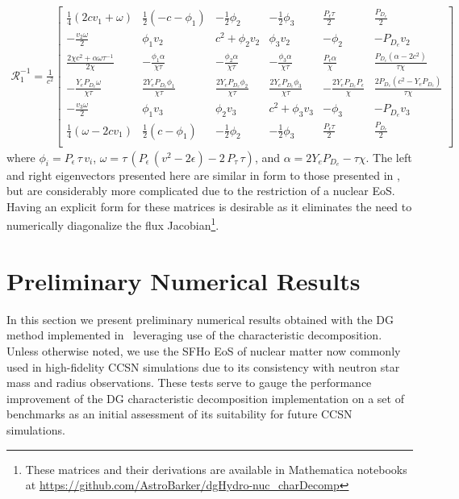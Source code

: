 \documentclass[onecolumn]{aastex62}
\begin{document}
\begin{align*}
  \mathcal{R}_{1}^{-1} = \frac{1}{c^2}
  \left[
  \begin{array}{cccccc}
   \frac{1}{4} (2 c  v_{1}+\omega ) & \frac{1}{2} (-c- \phi_{1} ) & -\frac{1}{2} \phi_{2}
    & -\frac{1}{2} \phi_{3}  & \frac{P_{\epsilon} \tau }{2} & \frac{P_{D_{e}}}{2}
     \\
   -\frac{v_{2} \omega }{2} & \phi_{1} v_{2}  & c^2+\phi_{2} v_{2}  &
     \phi_{3} v_{2}  & -\phi_{2}  & -P_{D_{e}} v_{2}
     \\
   \frac{2 \chi  c^2+\alpha  \omega \tau^{-1} }{2 \chi } & -\frac{\phi_{1} \alpha  }{\chi \tau } &
     -\frac{\phi_{2} \alpha  }{\chi \tau } & -\frac{\phi_{3} \alpha }{\chi \tau } &
     \frac{P_{\epsilon} \alpha }{\chi } & \frac{P_{D_{e}} \left(\alpha -2 c^2\right)}{\tau \chi }
      \\
   -\frac{Y_{e} P_{D_{e}} \omega }{\chi \tau } & \frac{2 Y_{e} P_{D_{e}} \phi_{1} }{\chi \tau } & \frac{2 Y_{e} P_{D_{e}}
     \phi_{2} }{\chi \tau} & \frac{2 Y_{e} P_{D_{e}} \phi_{3} }{\chi \tau} & -\frac{2 Y_{e}
     P_{D_{e}} P_{\epsilon} }{\chi } & \frac{2 P_{D_{e}} \left(c^2-Y_{e} P_{D_{e}} \right)}{\tau  \chi }
      \\
   -\frac{v_{3} \omega }{2} & \phi_{1} v_{3}  & \phi_{2} v_{3}   &
     c^2+\phi_{3} v_{3}  & -\phi_{3}  & -P_{D_{e}} v_{3}
      \\
   \frac{1}{4} (\omega -2 c  v_{1}) & \frac{1}{2} (c-\phi_{1} ) & -\frac{1}{2} \phi_{2}
       & -\frac{1}{2} \phi_{3}  & \frac{P_{\epsilon} \tau }{2} & \frac{P_{D_{e}}}{2}
     \\
  \end{array}
  \right]
\end{align*}
where $\phi_{i} = P_{\epsilon}\,\tau\, v_{i}$,
$\omega = \tau\, (P_{\epsilon}\,(v^2 - 2\epsilon) - 2\,P_{\tau}\,\tau)$, and
$\alpha = 2 Y_{e} P_{D_{e}} - \tau \chi$.
The left and right eigenvectors presented here are similar in form to those
presented in \citet{schaal:2015a}, but are considerably more complicated due to the
restriction of a nuclear EoS. Having an explicit form for these matrices is
desirable as it eliminates the need to numerically diagonalize the flux
Jacobian\footnote{These matrices and their derivations are available in Mathematica
notebooks at \url{https://github.com/AstroBarker/dgHydro-nuc_charDecomp}}.

\section{Preliminary Numerical Results}
\label{sec:results}
In this section we present preliminary numerical results obtained with the DG
method implemented in \thornado\, leveraging use of the characteristic
decomposition. Unless otherwise noted, we use the SFHo EoS of
nuclear matter \citep{steiner:2013} now commonly used in high-fidelity CCSN simulations
due to its consistency with neutron star mass and radius observations.
These tests serve to gauge the performance improvement of the
DG characteristic decomposition implementation on a set of benchmarks as an initial
assessment of its suitability for future CCSN simulations.
\end{document}
